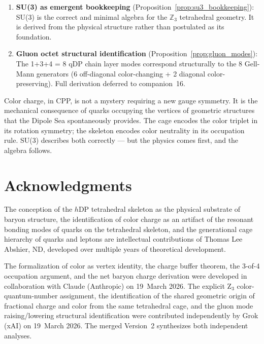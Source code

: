\documentclass[12pt]{article}
\newcommand{\hDP}{h\mathrm{DP}}
\begin{document}
\begin{enumerate}
\item \textbf{SU(3) as emergent bookkeeping}
  (Proposition~\ref{prop:su3_bookkeeping}): SU(3) is the correct
  and minimal algebra for the $\mathbb{Z}_3$ tetrahedral geometry.
  It is derived from the physical structure rather than postulated
  as its foundation.

\item \textbf{Gluon octet structural identification}
  (Proposition~\ref{prop:gluon_modes}): The 1+3+4 = 8 qDP chain
  layer modes correspond structurally to the 8 Gell-Mann generators
  (6 off-diagonal color-changing + 2 diagonal color-preserving).
  Full derivation deferred to companion~16.
\end{enumerate}

Color charge, in CPP, is not a mystery requiring a new gauge
symmetry.  It is the mechanical consequence of quarks occupying the
vertices of geometric structures that the Dipole Sea spontaneously
provides.  The cage encodes the color triplet in its rotation
symmetry; the skeleton encodes color neutrality in its occupation
rule.  SU(3) describes both correctly --- but the physics comes
first, and the algebra follows.

\section*{Acknowledgments}

The conception of the $\hDP$ tetrahedral skeleton as the physical
substrate of baryon structure, the identification of color charge
as an artifact of the resonant bonding modes of quarks on the
tetrahedral skeleton, and the generational cage hierarchy of quarks
and leptons are intellectual contributions of Thomas Lee Abshier, ND,
developed over multiple years of theoretical development.

The formalization of color as vertex identity, the charge buffer
theorem, the 3-of-4 occupation argument, and the net baryon charge
derivation were developed in collaboration with Claude (Anthropic)
on 19~March 2026.  The explicit Z$_3$ color-quantum-number
assignment, the identification of the shared geometric origin of
fractional charge and color from the same tetrahedral cage, and the
gluon mode raising/lowering structural identification were contributed
independently by Grok (xAI) on 19~March 2026.  The merged Version~2
synthesizes both independent analyses.
\end{document}
